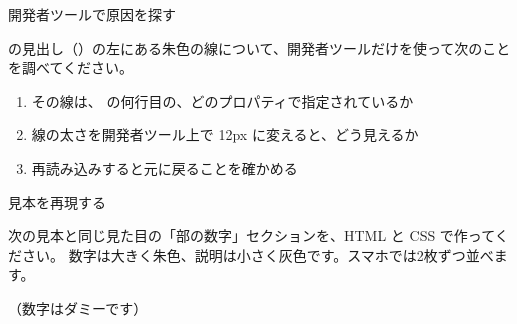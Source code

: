 \begin{exercise}[2]{開発者ツールで原因を探す}
\toanswer\par
{} の見出し（）の左にある朱色の線について、開発者ツールだけを使って次のことを調べてください。
\begin{enumerate}
  \item その線は、 の何行目の、どのプロパティで指定されているか
  \item 線の太さを開発者ツール上で 12px に変えると、どう見えるか
  \item 再読み込みすると元に戻ることを確かめる
\end{enumerate}
\end{exercise}

\begin{exercise}[3]{見本を再現する}
\toanswer\par
次の見本と同じ見た目の「部の数字」セクションを、HTML と CSS で作ってください。
数字は大きく朱色、説明は小さく灰色です。スマホでは2枚ずつ並べます。
\begin{center}
\end{center}
（数字はダミーです）
\end{exercise}
